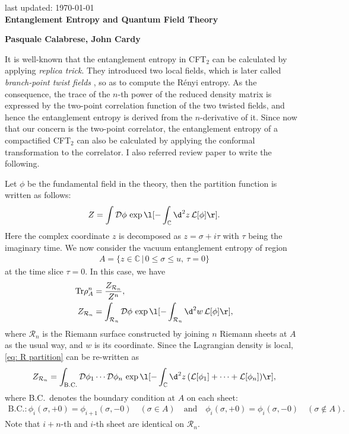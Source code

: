 \documentclass[12pt]{article}
\date{}
\renewcommand{\thefootnote}{\fnsymbol{footnote}}
\begin{document}
{\Large{}
\hfill{\normalsize last updated: \today}
\\[2mm]
\textbf{Entanglement Entropy and Quantum Field Theory\cite{Calabrese:2004eu}
}
}

\noindent
\hfill
\textbf{Pasquale Calabrese, John Cardy}%

\renewcommand{\thefootnote}{\arabic{footnote})}
\setcounter{footnote}{0}
\vspace{12pt}
It is well-known that the entanglement entropy in CFT$_2$ can be calculated by applying \textit{replica trick}.
They introduced two local fields, which is later called \textit{branch-point twist fields} \cite{Cardy:2007mb}, so as to compute the R\' enyi entropy.
As the consequence, the trace of the $n$-th power of the reduced density matrix is expressed by the two-point correlation function of the two twisted fields, and hence the entanglement entropy is derived from the $n$-derivative of it.
Since now that our concern is the two-point correlator, the entanglement entropy of a compactified CFT$_2$ can also be calculated by applying the conformal transformation to the correlator.
I also referred review paper \cite{Calabrese:2009qy} to write the following.

Let $\phi$ be the fundamental field in the theory, then the partition function is written as follows:
\begin{align}
	Z = \int\mathcal D\phi\,\exp\l[-\int_{\mathbb C}\d^2 z\,\mathcal L[\phi]\r].
\end{align}
Here the complex coordinate $z$ is decomposed as $z = \sigma + i\tau$ with $\tau$ being the imaginary time.
We now consider the vacuum entanglement entropy of region
\begin{align}
	A = \{z\in\mathbb C\,|\,0 \leq \sigma\leq u,~\tau = 0\}
\end{align}
at the time slice $\tau = 0$.
In this case, we have
\begin{align}
	\mathrm{Tr}\rho_A^n &= \frac{Z_{\mathcal{R}_n}}{Z^n},\label{eq: Tr rho}\\
	Z_{\mathcal R_n} &= 
		\int_{\mathcal R_n}\mathcal D\phi\,\exp\l[-\int_{\mathcal R_n}\d^2 w\,\mathcal L[\phi]\r],
		\label{eq: R partition}
\end{align}
where $\mathcal R_n$ is the Riemann surface constructed by joining $n$ Riemann sheets at $A$ as the usual way, and $w$ is its coordinate.
Since the Lagrangian density is local, \eqref{eq: R partition} can be re-written as
\begin{align}
	Z_{\mathcal R_n} = \int_\mathrm{B.C.}\mathcal D\phi_1\cdots\mathcal D\phi_n\,
	\exp\l[-\int_{\mathbb C}\d^2 z\,(\mathcal L[\phi_1]+\cdots+\mathcal L[\phi_n])\r],
	\label{eq: n partition}
\end{align}
where B.C.\ denotes the boundary condition at $A$ on each sheet:
\begin{align}
	\mathrm{B.C.}:\phi_i(\sigma,+0) = \phi_{i+1}(\sigma,-0)\quad(\sigma\in A)\quad
	\mathrm{and}\quad
	\phi_i(\sigma,+0) = \phi_i(\sigma,-0)\quad(\sigma\not\in A). 
	\label{eq: BC}
\end{align}
Note that $i+n$-th and $i$-th sheet are identical on $\mathcal R_n$.
\end{document}
